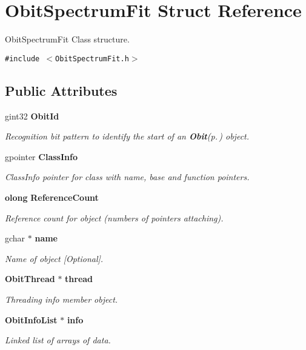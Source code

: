 \section{Obit\-Spectrum\-Fit Struct Reference}
\label{structObitSpectrumFit}
Obit\-Spectrum\-Fit Class structure.  


{\tt \#include $<$Obit\-Spectrum\-Fit.h$>$}

\subsection*{Public Attributes}
\begin{CompactItemize}
\item 
gint32 {\bf Obit\-Id}
\begin{CompactList}\small\item\em Recognition bit pattern to identify the start of an {\bf Obit}{\rm (p.\,\pageref{structObit})} object. \item\end{CompactList}\item 
gpointer {\bf Class\-Info}
\begin{CompactList}\small\item\em Class\-Info pointer for class with name, base and function pointers. \item\end{CompactList}\item 
{\bf olong} {\bf Reference\-Count}
\begin{CompactList}\small\item\em Reference count for object (numbers of pointers attaching). \item\end{CompactList}\item 
gchar $\ast$ {\bf name}
\begin{CompactList}\small\item\em Name of object [Optional]. \item\end{CompactList}\item 
{\bf Obit\-Thread} $\ast$ {\bf thread}
\begin{CompactList}\small\item\em Threading info member object. \item\end{CompactList}\item 
{\bf Obit\-Info\-List} $\ast$ {\bf info}
\begin{CompactList}\small\item\em Linked list of arrays of data. \item\end{CompactList}\item 

\end{CompactItemize}
